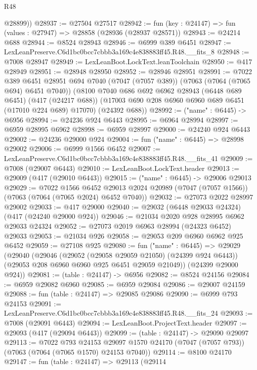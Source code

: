 \begin{lexlean}{R48}
\begin{coremodule}
        @28899))
@28937 := @27504 @27517
@28942 := fun (key : @24147) => fun (values : @27947) => @28858 (@28936 (@28937 @28571))
@28943 := @24214 @688
@28944 := @8524 @28943
@28946 := @6999 @389 @6451
@28947 := LexLeanPreserve.C6d1bc0bcc7cbbb3a169c4e838883ff45.R48.__fits_8
@28948 := @7008 @28947
@28949 := LexLeanBoot.LockText.leanToolchain
@28950 := @417 @28949
@28951 := @28948 @28950
@28952 := @28946 @28951
@28991 := @7022
    @389
    @6451
    @28951
    @694
    @7040
    (@7047 (@7057 @389))
    (@7063 (@7064 (@7065 @694) @6451 @7040))
    (@8100
      @7040
      @686
      @692
      @6962
      @28943
      (@6448 @689 @6451)
      (@417 (@24217 @688))
      (@17003 @690 @208 @6960 @6960 @689 @6451 (@17010 @224 @689) @17070)
      (@24392 @688))
@28992 := ("name" : @6445) -> @6956
@28994 := @24236 @924 @6443
@28995 := @6964 @28994
@28997 := @6959 @28995 @6962
@28998 := @6959 @28997
@29000 := @24240 @924 @6443
@29002 := @24236 @29000 @924
@29004 := fun ("name" : @6445) => @28998 @29002
@29006 := @6999 @1566 @6452
@29007 := LexLeanPreserve.C6d1bc0bcc7cbbb3a169c4e838883ff45.R48.__fits_41
@29009 := @7008 (@29007 @6443)
@29010 := LexLeanBoot.LockText.header
@29013 := @29009 (@417 (@29010 @6443))
@29015 := ("name" : @6445) -> @29006 @29013
@29029 := @7022
    @1566
    @6452
    @29013
    @2024
    @20989
    (@7047 (@7057 @1566))
    (@7063 (@7064 (@7065 @2024) @6452 @7040))
@29032 := @27073 @2022 @28997 @29002
@29033 := @417 @29000
@29040 := @29032 (@6448 @29033 @24324) (@417 (@24240 @29000 @924))
@29046 := @21034 @2020 @928 @28995 @6962 @29033 @24324
@29052 := @27073 @2019 @6963 @28994 (@24323 @6452) @29033
@29053 := @21034 @926
@29058 := @29053 @209 @6960 @6962 @925 @6452
@29059 := @27108 @925
@29080 := fun ("name" : @6445) =>
  @29029
    (@29040
      (@29046
        (@29052 (@29058 @29059 @21050) (@24399 @924 @6443))
        (@29053 @208 @6960 @6960 @925 @6451 @29059 @21049))
      (@24399 @29000 @924))
@29081 := (table : @24147) -> @6956
@29082 := @8524 @24156
@29084 := @6959 @29082 @6960
@29085 := @6959 @29084
@29086 := @29007 @24159
@29088 := fun (table : @24147) => @29085 @29086
@29090 := @6999 @793 @24153
@29091 := LexLeanPreserve.C6d1bc0bcc7cbbb3a169c4e838883ff45.R48.__fits_24
@29093 := @7008 (@29091 @6443)
@29094 := LexLeanBoot.ProjectText.header
@29097 := @29093 (@417 (@29094 @6443))
@29099 := (table : @24147) -> @29090 @29097
@29113 := @7022
    @793
    @24153
    @29097
    @1570
    @24170
    (@7047 (@7057 @793))
    (@7063 (@7064 (@7065 @1570) @24153 @7040))
@29114 := @8100 @24170
@29147 := fun (table : @24147) =>
  @29113
    (@29114

\end{coremodule}
\end{lexlean}
